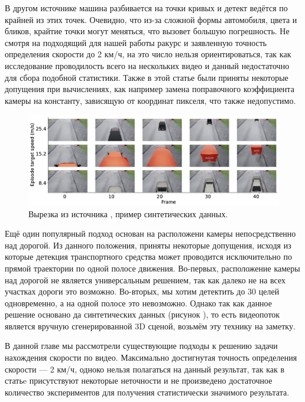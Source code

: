 \documentclass[specification,annotation,times]{itmo-student-thesis}
\begin{document}
	В другом источнике \cite{6754885} машина разбивается на точки кривых и детект \cite{surveillance} ведётся по крайней из этих точек. Очевидно, что из-за сложной формы автомобиля, цвета и бликов, крайтие точки могут меняться, что вызовет большую погрешность. Не смотря на подходящий для нашей работы ракурс и заявленную точность определения скорости до 2 км/ч, на это число нельзя ориентироваться, так как исследование \cite{6754885} проводилость всего на нескольких видео и данный недостаточно для сбора подобной статистики. Также  в этой статье были приняты некоторые допущения при вычислениях, как например замена поправочного коэффициента камеры на константу, зависящую от координат пикселя, что также недопустимо.
	
	
	\begin{figure}[!ht]
		\caption{Вырезка из источника \cite{09903}, пример синтетических данных.}\label{img:syntet}
		\includegraphics[width=0.85\linewidth]{../png/syntet.png}
		\centering
	\end{figure} 
	
	Ещё один популярный подход \cite{09903} основан на расположени камеры непосредственно над дорогой. Из данного положения, приняты некоторые допущения, исходя из которые детекция транспортного средства может проводится исключительно по прямой траектории по одной полосе движения. Во-первых, расположение камеры над дорогой не является универсальным решением, так как далеко не на всех участках дороги это возможно. Во-вторых, мы хотим детектить до 30 целей одновременно, а на одной полосе это невозможно. Однако так как данное решение основано да синтетических данных (рисунок ), то есть видеопоток является вручную сгенерированной 3D сценой, возьмём эту технику на заметку. 
	
	
	\finishrelatedwork
	
	\chapterconclusion
	В данной главе мы рассмотрели существующие подходы к решению задачи нахождения скорости по видео. Максимально достигнутая точность определения скорости --- 2 км/ч, одноко нельзя полагаться на данный результат, так как в статьe \cite{6754885} присутствуют некоторые неточности и не произведено достаточное количество экспериментов для получения статистически значимого результата. 
	
\end{document}
